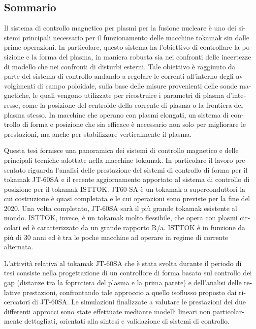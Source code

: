 \begin{otherlanguage}{italian}
\chapter*{Sommario}

Il sistema di controllo magnetico per plasmi per la fusione nucleare è uno dei sistemi principali necessario per il funzionamento delle macchine tokamak sin dalle prime operazioni. In particolare, questo sistema ha l’obiettivo di controllare la posizione e la forma del plasma, in maniera robusta sia nei confronti delle incertezze di modello che nei confronti di disturbi esterni. Tale obiettivo è raggiunto da parte del sistema di controllo andando a regolare le correnti all’interno degli avvolgimenti di campo poloidale, sulla base delle misure provenienti delle sonde magnetiche, le quali vengono utilizzate per ricostruire i parametri di plasma d’interesse, come la posizione del centroide della corrente di plasma o la frontiera del plasma stesso. In macchine che operano con plasmi elongati, un sistema di controllo di forma e posizione che sia efficace è necessario non solo per migliorare le prestazioni, ma anche per stabilizzare verticalmente il plasma.\smallskip

Questa tesi fornisce una panoramica dei sistemi di controllo magnetico e delle principali tecniche adottate nella macchine tokamak. In particolare il lavoro presentato riguarda l’analisi delle prestazione del sistemi di controllo di forma per il tokamak JT-60SA e il recente aggiornamento apportato al sistema di controllo di posizione per il tokamak ISTTOK. JT60-SA è un tokamak a superconduttori la cui costruzione è quasi completata e le cui operazioni sono previste per la fine del 2020. Una volta completato, JT-60SA sarà il più grande tokamak esistente al mondo. ISTTOK, invece, è un tokamak molto flessibile, che opera con plasmi circolari ed è caratterizzato da un grande rapporto R/a. ISTTOK è in funzione da più di 30 anni ed è tra le poche macchine ad operare in regime di corrente alternata.\smallskip

L’attività relativa al tokamak JT-60SA che è stata svolta durante il periodo di tesi consiste nella progettazione di un controllore di forma basato sul controllo dei gap (distanze tra la foprntiera del plasma e la prima parete) e dell’analisi delle relative prestazioni, confrontando tale approccio a quello isoflusso proposto dai ricercatori di JT-60SA. Le simulazioni finalizzate a valutare le prestazioni dei due differenti approcci sono state effettuate mediante modelli lineari non particolarmente dettagliati, orientati alla sintesi e validazione di sistemi di controllo.\smallskip


\end{otherlanguage}
